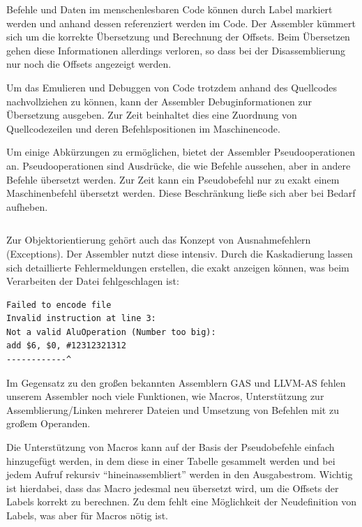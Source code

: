 Befehle und Daten im menschenlesbaren Code können durch Label markiert werden und anhand dessen referenziert werden im Code. Der Assembler kümmert sich um die korrekte Übersetzung und Berechnung der Offsets. Beim Übersetzen gehen diese Informationen allerdings verloren, so dass bei der Disassemblierung nur noch die Offsets angezeigt werden.

Um das Emulieren und Debuggen von Code trotzdem anhand des Quellcodes nachvollziehen zu können, kann der Assembler Debuginformationen zur Übersetzung ausgeben. Zur Zeit beinhaltet dies eine Zuordnung von Quellcodezeilen und deren Befehlspositionen im Maschinencode.

Um einige Abkürzungen zu ermöglichen, bietet der Assembler Pseudooperationen an. Pseudooperationen sind Ausdrücke, die wie Befehle aussehen, aber in andere Befehle übersetzt werden. Zur Zeit kann ein Pseudobefehl nur zu exakt einem Maschinenbefehl übersetzt werden. Diese Beschränkung ließe sich aber bei Bedarf aufheben.
\begin{center}
\inputminted[firstline=59,lastline=75]{py}{../assembler/operations/pseudoOperation.py}
\end{center}

Zur Objektorientierung gehört auch das Konzept von Ausnahmefehlern (Exceptions). Der Assembler nutzt diese intensiv. Durch die Kaskadierung lassen sich detaillierte Fehlermeldungen erstellen, die exakt anzeigen können, was beim Verarbeiten der Datei fehlgeschlagen ist:
\begin{center}
\begin{verbatim}
Failed to encode file
Invalid instruction at line 3:
Not a valid AluOperation (Number too big):
add $6, $0, #12312321312
------------^
\end{verbatim}
\end{center}

Im Gegensatz zu den großen bekannten Assemblern GAS und LLVM-AS fehlen unserem Assembler noch viele Funktionen, wie Macros, Unterstützung zur Assemblierung/Linken mehrerer Dateien und  Umsetzung von Befehlen mit zu großem Operanden.

Die Unterstützung von Macros kann auf der Basis der Pseudobefehle einfach hinzugefügt werden, in dem diese in einer Tabelle gesammelt werden und bei jedem Aufruf rekursiv ``hineinassembliert'' werden in den Ausgabestrom. Wichtig ist hierdabei, dass das Macro jedesmal neu übersetzt wird, um die Offsets der Labels korrekt zu berechnen. Zu dem fehlt eine Möglichkeit der Neudefinition von Labels, was aber für Macros nötig ist.

